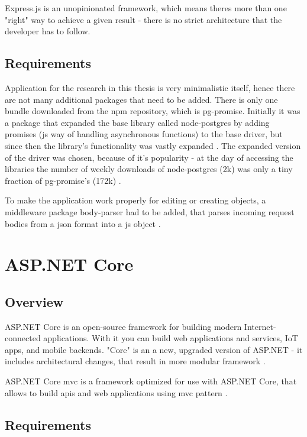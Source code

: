 Express.js is an unopinionated framework, which means theres more than one "right" way to achieve a given result - there is no strict architecture that the developer has to follow.

\subsection{Requirements}
Application for the research in this thesis is very minimalistic itself, hence there are not many additional packages that need to be added. There is only one bundle downloaded from the \acrshort{npm} repository, which is pg-promise. Initially it was a package that expanded the base library called node-postgres by adding promises (\acrlong{js} way of handling asynchronous functions) to the base driver, but since then the library's functionality was vastly expanded \cite{pgPromiseGit}.
The expanded version of the driver was chosen, because of it's popularity - at the day of accessing the libraries the number of weekly downloads of node-postgres (2k) \cite{nodePostgresNpm} was only a tiny fraction of pg-promise's (172k) \cite{pgPromiseNpm}.

To make the application work properly for editing or creating objects, a middleware package body-parser had to be added, that parses incoming request bodies from a json format into a \acrshort{js} object \cite{bodyParser}.

\section{ASP.NET Core}

\subsection{Overview}
ASP.NET Core is an open-source framework for building modern Internet-connected applications. With it you can build web applications and services, IoT apps, and mobile backends. "Core" is an a new, upgraded version of ASP.NET - it includes architectural changes, that result in more modular framework \cite{aspnetIntroduction}.

ASP.NET Core \acrshort{mvc} is a framework optimized for use with ASP.NET Core, that allows to build \acrshort{api}s and web applications using \acrlong{mvc} pattern \cite{aspnetMvcOverview}.

\subsection{Requirements}

